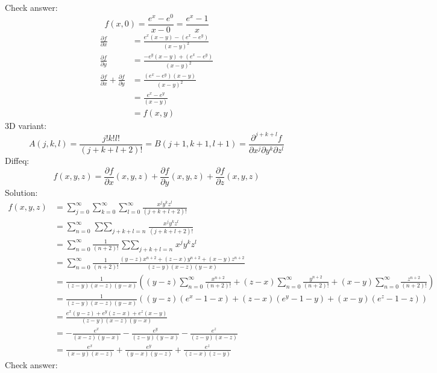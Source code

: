 \documentclass{article}
\begin{document}
Check answer:
\[f(x, 0) = \frac{e^x-e^0}{x-0} = \frac{e^x-1}{x}\]
\begin{align*}
  \frac{\partial f}{\partial x} &= \frac{e^x(x-y)-(e^x-e^y)}{(x-y)^2} \\
  \frac{\partial f}{\partial y} &= \frac{-e^y(x-y)+(e^x-e^y)}{(x-y)^2} \\
  \frac{\partial f}{\partial x}+\frac{\partial f}{\partial y} &= \frac{(e^x-e^y)(x-y)}{(x-y)^2} \\
  &= \frac{e^x-e^y}{(x-y)} \\
  &= f(x, y)
\end{align*}
\newpage
3D variant:
\[A(j, k, l) = \frac{j!k!l!}{(j+k+l+2)!} = B(j+1, k+1, l+1)
= \frac{\partial^{j+k+l}f}{\partial x^j \partial y^k \partial z^l}\]
Diffeq:
\[
f(x, y, z)
= \frac{\partial f}{\partial x}(x, y, z)
+ \frac{\partial f}{\partial y}(x, y, z)
+ \frac{\partial f}{\partial z}(x, y, z)
\]
Solution:
\begin{align*}
  f(x, y, z) &= \sum_{j=0}^\infty\sum_{k=0}^\infty\sum_{l=0}^\infty\frac{x^jy^kz^l}{(j+k+l+2)!} \\
  &= \sum_{n=0}^\infty\mathop{\sum\sum}_{j+k+l=n}\frac{x^jy^kz^l}{(j+k+l+2)!} \\
  &= \sum_{n=0}^\infty\frac{1}{(n+2)!}\mathop{\sum\sum}_{j+k+l=n}x^jy^kz^l \\
  &= \sum_{n=0}^\infty\frac{1}{(n+2)!}\frac{(y-z)x^{n+2}+(z-x)y^{n+2}+(x-y)z^{n+2}}{(z-y)(x-z)(y-x)} \\
  &= \frac{1}{(z-y)(x-z)(y-x)}\left(
  (y-z)\sum_{n=0}^\infty\frac{x^{n+2}}{(n+2)!} +
  (z-x)\sum_{n=0}^\infty\frac{y^{n+2}}{(n+2)!} +
  (x-y)\sum_{n=0}^\infty\frac{z^{n+2}}{(n+2)!}
  \right) \\
  &= \frac{1}{(z-y)(x-z)(y-x)}((y-z)(e^x-1-x)+(z-x)(e^y-1-y)+(x-y)(e^z-1-z)) \\
  &= \frac{e^x(y-z)+e^y(z-x)+e^z(x-y)}{(z-y)(x-z)(y-x)} \\
  &= -\frac{e^x}{(x-z)(y-x)}-\frac{e^y}{(z-y)(y-x)}-\frac{e^z}{(z-y)(x-z)} \\
  &= \frac{e^x}{(x-y)(x-z)}+\frac{e^y}{(y-x)(y-z)}+\frac{e^z}{(z-x)(z-y)}
\end{align*}
Check answer:
\end{document}
